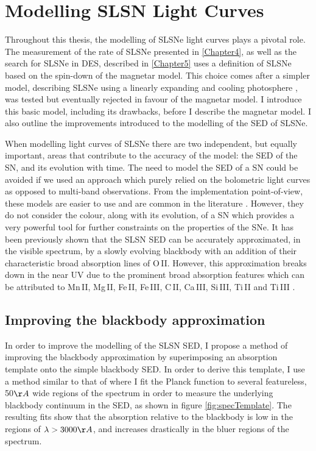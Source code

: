 \section{Modelling SLSN Light Curves} \label{sec:SLAP}
Throughout this thesis, the modelling of SLSNe light curves plays a pivotal role. The measurement of the rate of SLSNe presented in \cref{Chapter4}, as well as the search for SLSNe in DES, described in \cref{Chapter5} uses a definition of SLSNe based on the spin-down of the magnetar model. This choice comes after a simpler model, describing SLSNe using a linearly expanding and cooling photosphere \citep{Howell2013}, was tested but eventually rejected in favour of the magnetar model. I introduce this basic model, including its drawbacks, before I describe the magnetar model. I also outline the improvements introduced to the modelling of the SED of SLSNe.

When modelling light curves of SLSNe there are two independent, but equally important, areas that contribute to the accuracy of the model: the SED of the SN, and its evolution with time. The need to model the SED of a SN could be avoided if we used an approach which purely relied on the bolometric light curves as opposed to multi-band observations. From the implementation point-of-view, these models are easier to use and are common in the literature \citep{Inserra2013,Papadopoulos2015,Nicholl2014}. However, they do not consider the colour, along with its evolution, of a SN which provides a very powerful tool for further constraints on the properties of the SNe. It has been previously shown \citep{Chomiuk2011,Howell2013,Papadopoulos2015,Vreeswijk2014} that the SLSN SED can be accurately approximated, in the visible spectrum, by a slowly evolving blackbody with an addition of their characteristic broad absorption lines of O\,II. However, this approximation breaks down in the near UV due to the prominent broad absorption features which can be attributed to Mn\,II, Mg\,II, Fe\,II, Fe\,III, C\,II, Ca\,III, Si\,III, Ti\,II and Ti\,III \citep[see][for line identifications]{Mazzali2015,Quimby2018}.

\subsection{Improving the blackbody approximation} \label{sec:KCorrection}
In order to improve the modelling of the SLSN SED, I propose a method of improving the blackbody approximation by superimposing an absorption template onto the simple blackbody SED. In order to derive this template, I use a method similar to that of  \citet{Vreeswijk2014} where I fit the Planck function to several featureless, 50$\AA$ wide regions of the spectrum in order to measure the underlying blackbody continuum in the SED, as shown in figure \ref{fig:specTemplate}. The resulting fits show that the absorption relative to the blackbody is low in the regions of $\lambda>3000\AA$, and increases drastically in the bluer regions of the spectrum.

